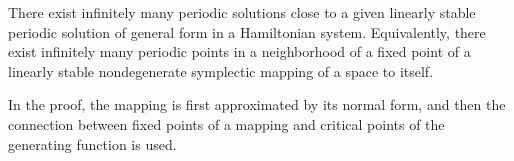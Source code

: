 There exist infinitely many periodic solutions close to a given linearly stable periodic solution of general form in a Hamiltonian system. Equivalently, there exist infinitely many periodic points in a neighborhood of a fixed point of a linearly stable nondegenerate symplectic mapping of a space to itself.

In the proof, the mapping is first approximated by its normal form, and then the connection between fixed points of a mapping and critical points of the generating function is used.
